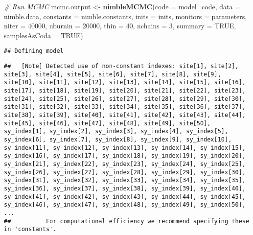 \documentclass[
]{article}
\newenvironment{Shaded}{\begin{snugshade}}{\end{snugshade}}
\newcommand{\AttributeTok}[1]{\textcolor[rgb]{0.13,0.29,0.53}{#1}}
\newcommand{\CommentTok}[1]{\textcolor[rgb]{0.56,0.35,0.01}{\textit{#1}}}
\newcommand{\ConstantTok}[1]{\textcolor[rgb]{0.56,0.35,0.01}{#1}}
\newcommand{\DecValTok}[1]{\textcolor[rgb]{0.00,0.00,0.81}{#1}}
\newcommand{\FunctionTok}[1]{\textcolor[rgb]{0.13,0.29,0.53}{\textbf{#1}}}
\newcommand{\NormalTok}[1]{#1}
\newcommand{\OtherTok}[1]{\textcolor[rgb]{0.56,0.35,0.01}{#1}}
\begin{document}
\begin{Shaded}
\begin{Highlighting}[]
\CommentTok{\# Run MCMC}
\NormalTok{mcmc.output }\OtherTok{\textless{}{-}} \FunctionTok{nimbleMCMC}\NormalTok{(}\AttributeTok{code      =}\NormalTok{ model\_code, }
                          \AttributeTok{data      =}\NormalTok{ nimble.data,}
                          \AttributeTok{constants =}\NormalTok{ nimble.constants, }
                          \AttributeTok{inits     =}\NormalTok{ inits,}
                          \AttributeTok{monitors  =}\NormalTok{ parameters,}
                          \AttributeTok{niter     =} \DecValTok{40000}\NormalTok{, }
                          \AttributeTok{nburnin   =} \DecValTok{20000}\NormalTok{, }
                          \AttributeTok{thin      =} \DecValTok{40}\NormalTok{, }
                          \AttributeTok{nchains   =} \DecValTok{3}\NormalTok{,}
                          \AttributeTok{summary   =} \ConstantTok{TRUE}\NormalTok{,}
                          \AttributeTok{samplesAsCoda =} \ConstantTok{TRUE}\NormalTok{)}
\end{Highlighting}
\end{Shaded}

\begin{verbatim}
## Defining model
\end{verbatim}

\begin{verbatim}
##   [Note] Detected use of non-constant indexes: site[1], site[2], site[3], site[4], site[5], site[6], site[7], site[8], site[9], site[10], site[11], site[12], site[13], site[14], site[15], site[16], site[17], site[18], site[19], site[20], site[21], site[22], site[23], site[24], site[25], site[26], site[27], site[28], site[29], site[30], site[31], site[32], site[33], site[34], site[35], site[36], site[37], site[38], site[39], site[40], site[41], site[42], site[43], site[44], site[45], site[46], site[47], site[48], site[49], site[50], sy_index[1], sy_index[2], sy_index[3], sy_index[4], sy_index[5], sy_index[6], sy_index[7], sy_index[8], sy_index[9], sy_index[10], sy_index[11], sy_index[12], sy_index[13], sy_index[14], sy_index[15], sy_index[16], sy_index[17], sy_index[18], sy_index[19], sy_index[20], sy_index[21], sy_index[22], sy_index[23], sy_index[24], sy_index[25], sy_index[26], sy_index[27], sy_index[28], sy_index[29], sy_index[30], sy_index[31], sy_index[32], sy_index[33], sy_index[34], sy_index[35], sy_index[36], sy_index[37], sy_index[38], sy_index[39], sy_index[40], sy_index[41], sy_index[42], sy_index[43], sy_index[44], sy_index[45], sy_index[46], sy_index[47], sy_index[48], sy_index[49], sy_index[50], ...
##          For computational efficiency we recommend specifying these in 'constants'.
\end{verbatim}
\end{document}
